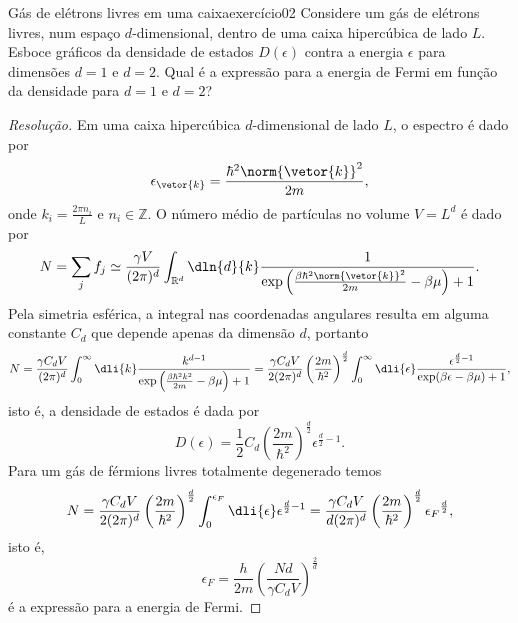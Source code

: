 \begin{exercício}{Gás de elétrons livres em uma caixa}{exercício02}
    Considere um gás de elétrons livres, num espaço \(d\)-dimensional, dentro de uma caixa hipercúbica de lado \(L\). Esboce gráficos da densidade de estados \(D(\epsilon)\) contra a energia \(\epsilon\) para dimensões \(d = 1\) e \(d = 2\). Qual é a expressão para a energia de Fermi em função da densidade para \(d = 1\) e \(d = 2\)?
\end{exercício}
\begin{proof}[Resolução]
    Em uma caixa hipercúbica \(d\)-dimensional de lado \(L\), o espectro é dado por
    \begin{equation*}
        \epsilon_{\vetor{k}} = \frac{\hbar^2\norm{\vetor{k}}^2}{2m},
    \end{equation*}
    onde \(k_i = \frac{2\pi n_i}{L}\) e \(n_i \in \mathbb{Z}\). O número médio de partículas no volume \(V = L^d\) é dado por
    \begin{equation*}
        N = \sum_j f_j \simeq \frac{\gamma V}{(2\pi)^d} \int_{\mathbb{R}^d}\dln{d}{k} \frac{1}{\exp\left(\frac{\beta\hbar^2\norm{\vetor{k}}^2}{2m} - \beta \mu\right) + 1}.
    \end{equation*}
    Pela simetria esférica, a integral nas coordenadas angulares resulta em alguma constante \(C_d\) que depende apenas da dimensão \(d\), portanto
    \begin{equation*}
        N = \frac{\gamma C_d V}{(2\pi)^d} \int_{0}^\infty\dli{k} \frac{k^{d - 1}}{\exp\left(\frac{\beta \hbar^2 k^2}{2m} - \beta \mu\right)+ 1} = \frac{\gamma C_d V}{2(2\pi)^d}  \left(\frac{2m}{\hbar^2}\right)^{\frac{d}2} \int_0^\infty \dli{\epsilon} \frac{\epsilon^{\frac{d}{2} - 1}}{\exp(\beta \epsilon - \beta \mu) + 1},
    \end{equation*}
    isto é, a densidade de estados é dada por
    \begin{equation*}
        D(\epsilon) = \frac12 C_d \left(\frac{2m}{\hbar^2}\right)^{\frac{d}{2}} \epsilon^{\frac{d}{2} - 1}.
    \end{equation*}
    Para um gás de férmions livres totalmente degenerado temos
    \begin{equation*}
        N = \frac{\gamma C_d V}{2(2\pi)^d}\left(\frac{2m}{\hbar^2}\right)^{\frac{d}{2}} \int_0^{\epsilon_F} \dli{\epsilon} \epsilon^{\frac{d}{2}-1} = \frac{\gamma C_d V}{d(2\pi)^d}\left(\frac{2m}{\hbar^2}\right)^{\frac{d}{2}} {\epsilon_F}^{\frac{d}2},
    \end{equation*}
    isto é,
    \begin{equation*}
        \epsilon_F = \frac{h}{2m}\left(\frac{Nd}{\gamma C_dV}\right)^{\frac{2}{d}}
    \end{equation*}
    é a expressão para a energia de Fermi.
\end{proof}
